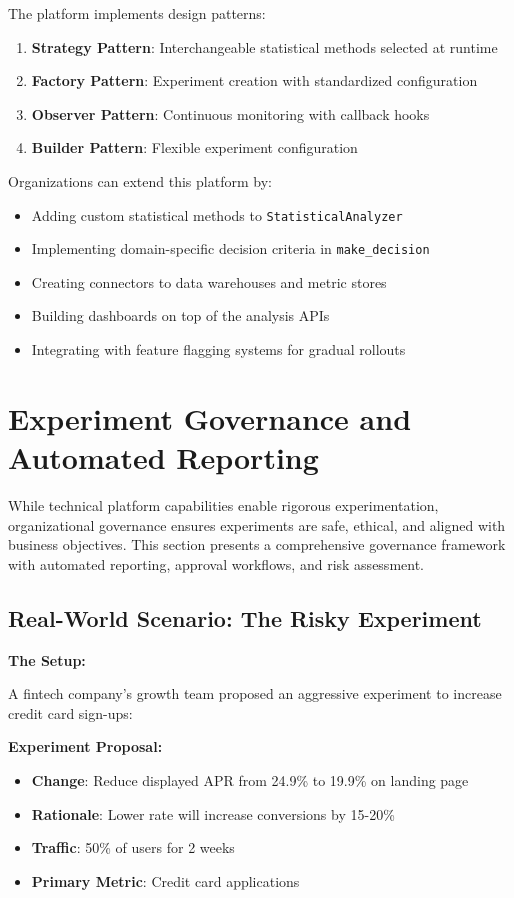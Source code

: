 The platform implements design patterns:
\begin{enumerate}
    \item \textbf{Strategy Pattern}: Interchangeable statistical methods selected at runtime
    \item \textbf{Factory Pattern}: Experiment creation with standardized configuration
    \item \textbf{Observer Pattern}: Continuous monitoring with callback hooks
    \item \textbf{Builder Pattern}: Flexible experiment configuration
\end{enumerate}

Organizations can extend this platform by:
\begin{itemize}
    \item Adding custom statistical methods to \texttt{StatisticalAnalyzer}
    \item Implementing domain-specific decision criteria in \texttt{make\_decision}
    \item Creating connectors to data warehouses and metric stores
    \item Building dashboards on top of the analysis APIs
    \item Integrating with feature flagging systems for gradual rollouts
\end{itemize}

\section{Experiment Governance and Automated Reporting}

While technical platform capabilities enable rigorous experimentation, organizational governance ensures experiments are safe, ethical, and aligned with business objectives. This section presents a comprehensive governance framework with automated reporting, approval workflows, and risk assessment.

\subsection{Real-World Scenario: The Risky Experiment}

\textbf{The Setup:}

A fintech company's growth team proposed an aggressive experiment to increase credit card sign-ups:

\textbf{Experiment Proposal:}
\begin{itemize}
    \item \textbf{Change}: Reduce displayed APR from 24.9\% to 19.9\% on landing page
    \item \textbf{Rationale}: Lower rate will increase conversions by 15-20\%
    \item \textbf{Traffic}: 50\% of users for 2 weeks
    \item \textbf{Primary Metric}: Credit card applications
\end{itemize}

